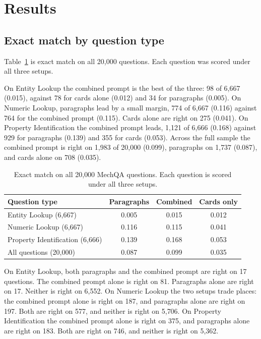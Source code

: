 \documentclass[conference]{IEEEtran}
\begin{document}
\section{Results}
\label{sec:results}
\subsection{Exact match by question type}
Table~\ref{tab:em} is exact match on all 20{,}000 questions. Each question was scored under all three setups.

On Entity Lookup the combined prompt is the best of the three: 98 of 6{,}667 (0.015), against 78 for cards alone (0.012) and 34 for paragraphs (0.005). On Numeric Lookup, paragraphs lead by a small margin, 774 of 6{,}667 (0.116) against 764 for the combined prompt (0.115). Cards alone are right on 275 (0.041). On Property Identification the combined prompt leads, 1{,}121 of 6{,}666 (0.168) against 929 for paragraphs (0.139) and 355 for cards (0.053). Across the full sample the combined prompt is right on 1{,}983 of 20{,}000 (0.099), paragraphs on 1{,}737 (0.087), and cards alone on 708 (0.035).

\begin{table}[t]
\caption{Exact match on all 20{,}000 MechQA questions. Each question is scored under all three setups.}
\label{tab:em}
\centering
\begin{tabular}{lccc}
\toprule
Question type & Paragraphs & Combined & Cards only \\
\midrule
Entity Lookup (6{,}667) & 0.005 & 0.015 & 0.012 \\
Numeric Lookup (6{,}667) & 0.116 & 0.115 & 0.041 \\
Property Identification (6{,}666) & 0.139 & 0.168 & 0.053 \\
All questions (20{,}000) & 0.087 & 0.099 & 0.035 \\
\bottomrule
\end{tabular}
\end{table}

On Entity Lookup, both paragraphs and the combined prompt are right on 17 questions. The combined prompt alone is right on 81. Paragraphs alone are right on 17. Neither is right on 6{,}552. On Numeric Lookup the two setups trade places: the combined prompt alone is right on 187, and paragraphs alone are right on 197. Both are right on 577, and neither is right on 5{,}706. On Property Identification the combined prompt alone is right on 375, and paragraphs alone are right on 183. Both are right on 746, and neither is right on 5{,}362.
\end{document}
